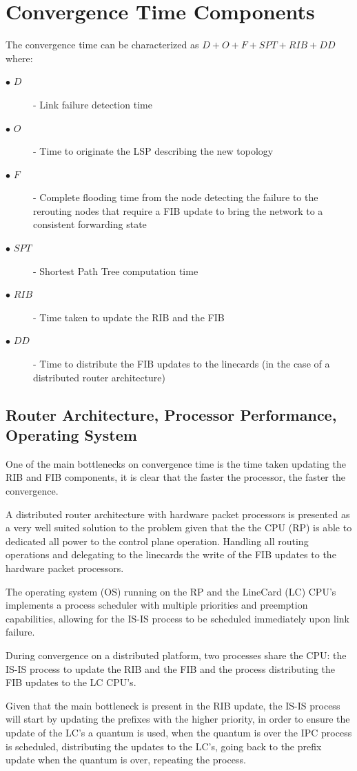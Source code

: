 \documentclass[a4paper, 11pt, UTF8]{article}
\begin{document}
\section{Convergence Time Components}
The convergence time can be characterized as $D + O + F + SPT + RIB + DD$ where:
\begin{description}
	\item[$\bullet$ $D$] - Link failure detection time
	\item[$\bullet$ $O$] - Time to originate the LSP describing the new topology
	\item[$\bullet$ $F$] - Complete flooding time from the node detecting the failure to the rerouting nodes that require a FIB update to bring the network to a consistent forwarding state
	\item[$\bullet$ $SPT$] - Shortest Path Tree computation time
	\item[$\bullet$ $RIB$] - Time taken to update the RIB and the FIB
	\item[$\bullet$ $DD$] - Time to distribute the FIB updates to the linecards (in the case of a distributed router architecture)
\end{description}

\subsection{Router Architecture, Processor Performance, Operating System}
One of the main bottlenecks on convergence time is the time taken updating the RIB and FIB components,
it is clear that the faster the processor, the faster the convergence.

A distributed router architecture with hardware packet processors is presented as a very well suited solution to
the problem given that the the CPU (RP) is able to dedicated all power to the control plane operation.
Handling all routing operations and delegating to the linecards the write of the FIB updates to the hardware packet processors.

The operating system (OS) running on the RP and the LineCard (LC) CPU's  
implements a process scheduler with multiple priorities and preemption capabilities, 
allowing for the IS-IS process to be scheduled immediately upon link failure.

During convergence on a distributed platform, two processes share the CPU: 
the IS-IS process to update the RIB and the FIB and the process distributing the FIB updates to the LC CPU's.

Given that the main bottleneck is present in the RIB update, 
the IS-IS process will start by updating the prefixes with the higher priority, 
in order to ensure the update of the LC's a quantum is used, 
when the quantum is over the IPC process is scheduled, distributing the updates to the LC's, going back to the prefix update when the quantum is over, repeating the process.
\end{document}
